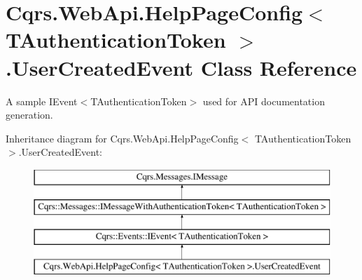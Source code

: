 \hypertarget{classCqrs_1_1WebApi_1_1HelpPageConfig_1_1UserCreatedEvent}{}\section{Cqrs.\+Web\+Api.\+Help\+Page\+Config$<$ T\+Authentication\+Token $>$.User\+Created\+Event Class Reference}
\label{classCqrs_1_1WebApi_1_1HelpPageConfig_1_1UserCreatedEvent}


A sample I\+Event$<$\+T\+Authentication\+Token$>$ used for A\+PI documentation generation.  


Inheritance diagram for Cqrs.\+Web\+Api.\+Help\+Page\+Config$<$ T\+Authentication\+Token $>$.User\+Created\+Event\+:\begin{figure}[H]
\begin{center}
\leavevmode
\includegraphics[height=4.000000cm]{classCqrs_1_1WebApi_1_1HelpPageConfig_1_1UserCreatedEvent}
\end{center}
\end{figure}
